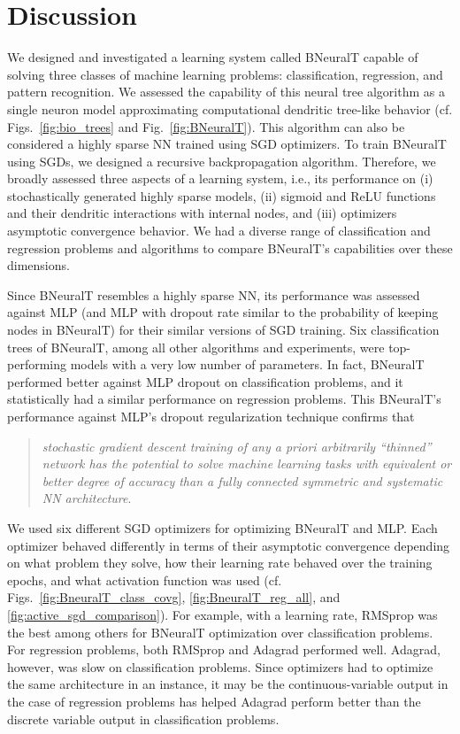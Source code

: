 \documentclass[11pt,a4paper]{article}
\begin{document}
    
    \section{Discussion} 
    \label{sec:discussion}   
We designed and investigated a learning system called BNeuralT capable of solving three classes of machine learning problems: classification, regression, and pattern recognition. We assessed the capability of this neural tree algorithm as a single neuron model approximating computational dendritic tree-like behavior (cf. Figs.~\ref{fig:bio_trees} and Fig.~\ref{fig:BNeuralT}). This algorithm can also be considered a highly sparse NN trained using SGD optimizers. To train BNeuralT using SGDs, we designed a recursive backpropagation algorithm. Therefore, we broadly assessed three aspects of a learning system, i.e., its performance on (i) stochastically generated highly sparse models, (ii) sigmoid and ReLU functions and their dendritic interactions with internal nodes, and (iii) optimizers asymptotic convergence behavior. We had a diverse range of classification and regression problems and algorithms to compare BNeuralT's capabilities over these dimensions. 
    
    Since BNeuralT resembles a highly sparse NN, its performance was assessed against MLP (and MLP with dropout rate similar to the  probability of keeping nodes in BNeuralT) for their similar versions of SGD training. Six classification trees of BNeuralT, among all other algorithms and experiments, were top-performing models with a very low number of parameters. In fact, BNeuralT performed better against MLP dropout on classification problems, and it statistically had a similar performance on regression problems. This BNeuralT's performance against MLP's dropout regularization technique confirms that 
    \begin{quote}
    	    \textit{stochastic gradient descent training of any a priori arbitrarily ``thinned'' network has the potential to solve machine learning tasks with equivalent or better degree of accuracy than a fully connected symmetric and systematic NN architecture}. 
    \end{quote}

    
    We used six different SGD optimizers for optimizing BNeuralT and MLP. Each optimizer behaved differently in terms of their asymptotic convergence depending on what problem they solve, how their learning rate behaved over the training epochs, and what activation function was used  (cf. Figs.~\ref{fig:BneuralT_class_covg}, \ref{fig:BneuralT_reg_all}, and \ref{fig:active_sgd_comparison}). For example, with a  learning rate, RMSprop was the best among others for BNeuralT optimization over classification problems. For regression problems, both RMSprop and Adagrad performed well. Adagrad, however, was slow on classification problems. Since optimizers had to optimize the same architecture in an instance, it may be the continuous-variable output in the case of regression problems has helped Adagrad perform better than the discrete variable output in classification problems.
    
\end{document}
